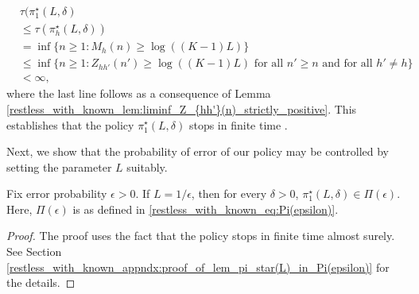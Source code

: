\begingroup\allowdisplaybreaks\begin{align}
	&\tau(\pi_1^\star(L,\delta)\nonumber\\
	&\leq \tau(\pi^\star_h(L,\delta))\nonumber\\
	&=\inf\{n\geq 1:M_h(n)\geq \log((K-1)L)\}\nonumber\\
	&\leq \inf\bigg\lbrace n\geq 1:Z_{hh'}(n')\geq \log((K-1)L)\text{ for all }n'\geq n\text{ and for all }h'\neq h\bigg\rbrace\nonumber\\
	&<\infty,\label{restless_with_known_eq:stopping_time_finite_almost_surely}
\end{align}\endgroup
where the last line follows as a consequence of Lemma \ref{restless_with_known_lem:liminf_Z_{hh'}(n)_strictly_positive}. This establishes that the policy $\pi_1^\star(L,\delta)$ stops in finite time .



Next, we show that the probability of error of our policy may be controlled by setting the parameter $L$ suitably.
\begin{lemma}\label{restless_with_known_lem:pi_star(L)_in_Pi(epsilon)}
	Fix error probability $\epsilon>0$. If $L=1/\epsilon$, then for every $\delta>0$, $\pi_1^\star(L,\delta)\in\Pi(\epsilon)$. Here, $\Pi(\epsilon)$ is as defined in \eqref{restless_with_known_eq:Pi(epsilon)}.
\end{lemma}
\begin{proof}
The proof uses the fact that the policy stops in finite time almost surely. See Section \ref{restless_with_known_appndx:proof_of_lem_pi_star(L)_in_Pi(epsilon)} for the details.	
\end{proof}

